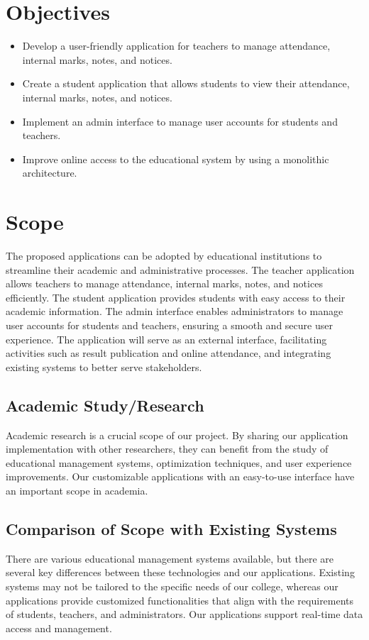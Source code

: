 \section{Objectives}
\begin{itemize}
  \item Develop a user-friendly application for teachers to manage attendance, internal marks, notes, and notices.
  \item Create a student application that allows students to view their attendance, internal marks, notes, and notices.
  \item Implement an admin interface to manage user accounts for students and teachers.
  \item Improve online access to the educational system by using a monolithic architecture.
\end{itemize}

\section{Scope}
The proposed applications can be adopted by educational institutions to streamline their academic and administrative processes. The teacher application allows teachers to manage attendance, internal marks, notes, and notices efficiently. The student application provides students with easy access to their academic information. The admin interface enables administrators to manage user accounts for students and teachers, ensuring a smooth and secure user experience. The application will serve as an external interface, facilitating activities such as result publication and online attendance, and integrating existing systems to better serve stakeholders.

\subsection{Academic Study/Research}
Academic research is a crucial scope of our project. By sharing our application implementation with other researchers, they can benefit from the study of educational management systems, optimization techniques, and user experience improvements. Our customizable applications with an easy-to-use interface have an important scope in academia.

\subsection{Comparison of Scope with Existing Systems}
There are various educational management systems available, but there are several key differences between these technologies and our applications. Existing systems may not be tailored to the specific needs of our college, whereas our applications provide customized functionalities that align with the requirements of students, teachers, and administrators. Our applications support real-time data access and management.